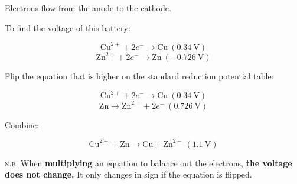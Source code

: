 \documentclass[a4paper, 12pt]{article}
\begin{document}
Electrons flow from the anode to the cathode.

To find the voltage of this battery:

$$\text{Cu}^{2+} + 2e^- \longrightarrow \text{Cu} \: (0.34 \: \text{V})$$
$$\text{Zn}^{2+} + 2e^- \longrightarrow \text{Zn} \: (-0.726 \: \text{V})$$

Flip the equation that is higher on the standard reduction potential table:

$$\text{Cu}^{2+} + 2e^- \longrightarrow \text{Cu} \: (0.34 \: \text{V})$$
$$\text{Zn} \longrightarrow \text{Zn}^{2+} + 2e^- \: (0.726 \: \text{V})$$

Combine:

$$\text{Cu}^{2+} + \text{Zn} \longrightarrow \text{Cu} + \text{Zn}^{2+} \: \boxed{(1.1 \: \text{V})}$$

\textsc{n.b.} When \textbf{multiplying} an equation to balance out the electrons, \textbf{the voltage does not change.} It only changes in sign if the equation is flipped.
\end{document}
